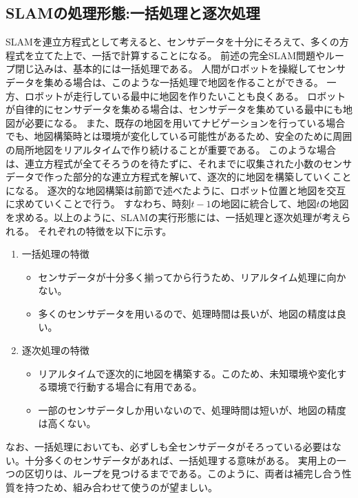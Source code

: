 \subsection{SLAMの処理形態:一括処理と逐次処理}
SLAMを連立方程式として考えると、センサデータを十分にそろえて、多くの方程式を立てた上で、一括で計算することになる。
前述の完全SLAM問題やループ閉じ込みは、基本的には一括処理である。
人間がロボットを操縦してセンサデータを集める場合は、このような一括処理で地図を作ることができる。
一方、ロボットが走行している最中に地図を作りたいことも良くある。
ロボットが自律的にセンサデータを集める場合は、センサデータを集めている最中にも地図が必要になる。
また、既存の地図を用いてナビゲーションを行っている場合でも、地図構築時とは環境が変化している可能性があるため、安全のために周囲の局所地図をリアルタイムで作り続けることが重要である。
このような場合は、連立方程式が全てそろうのを待たずに、それまでに収集された小数のセンサデータで作った部分的な連立方程式を解いて、逐次的に地図を構築していくことになる。
逐次的な地図構築は前節で述べたように、ロボット位置と地図を交互に求めていくことで行う。
すなわち、時刻$t-1$の地図に統合して、地図$t$の地図を求める。以上のように、SLAMの実行形態には、一括処理と逐次処理が考えられる。
それぞれの特徴を以下に示す。

\begin{enumerate}
  \item 一括処理の特徴
  \begin{itemize}
    \item センサデータが十分多く揃ってから行うため、リアルタイム処理に向かない。
    \item 多くのセンサデータを用いるので、処理時間は長いが、地図の精度は良い。
  \end{itemize}
  \item 逐次処理の特徴
  \begin{itemize}
    \item リアルタイムで逐次的に地図を構築する。このため、未知環境や変化する環境で行動する場合に有用である。
    \item 一部のセンサデータしか用いないので、処理時間は短いが、地図の精度は高くない。
  \end{itemize}
\end{enumerate}

なお、一括処理においても、必ずしも全センサデータがそろっている必要はない。十分多くのセンサデータがあれば、一括処理する意味がある。
実用上の一つの区切りは、ループを見つけるまでである。このように、両者は補完し合う性質を持つため、組み合わせて使うのが望ましい。

